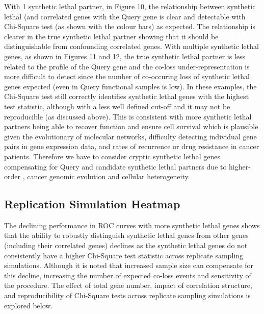 With 1 \gls{synthetic lethal} partner, in Figure 10, the relationship between \gls{synthetic lethal} (and correlated genes with the Query gene is clear and detectable with Chi-Square test (as shown with the colour bars) as expected.  The relationship is clearer in the true \gls{synthetic lethal} partner showing that it should be distinguishable from confounding correlated genes.  With multiple \gls{synthetic lethal} genes, as shown in Figures 11 and 12, the true \gls{synthetic lethal} partner is less related to the  profile of the Query gene and the co-loss under-representation is more difficult to detect since the number of co-occuring loss of \gls{synthetic lethal} genes expected (even in Query functional samples is low).  In these examples, the Chi-Square test still correctly identifies \gls{synthetic lethal} genes with the highest test statistic, although with a less well defined cut-off and it may not be reproducible (as discussed above).  This is consistent with more \gls{synthetic lethal} partners being able to recover function and ensure cell survival which is plausible given the evolutionary  of molecular networks, difficulty detecting individual gene pairs in \gls{gene expression} data, and rates of recurrence or drug resistance in cancer patients.  Therefore we have to consider cryptic \gls{synthetic lethal} genes compensating for Query and candidate \gls{synthetic lethal} partners due to higher-order , cancer \gls{genomic} evolution and cellular heterogeneity.

\subsection{Replication Simulation Heatmap}

The declining performance in \gls{ROC} curves with more \gls{synthetic lethal} genes shows that the ability to robustly distinguish \gls{synthetic lethal} genes from other genes (including their correlated genes) declines as the \gls{synthetic lethal} genes do not consistently have a higher Chi-Square test statistic across replicate sampling simulations.  Although it is noted that increased sample size can compensate for this decline, increasing the number of expected co-loss events and sensitivity of the procedure.  The effect of total gene number, impact of correlation structure, and reproducibility of Chi-Square tests across replicate sampling simulations is explored below.

